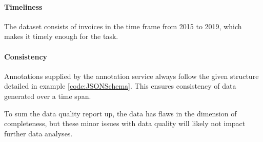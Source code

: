 \paragraph{Timeliness}
The dataset consists of invoices in the time frame from 2015 to 2019, which makes it timely enough for the task.
\paragraph{Consistency}
 Annotations supplied by the annotation service always follow the given structure detailed in example \ref{code:JSONSchema}. This ensures consistency of data generated over a time span.
 
 To sum the data quality report up, the data has flaws in the dimension of completeness, but these minor issues with data quality will likely not impact further data analyses.